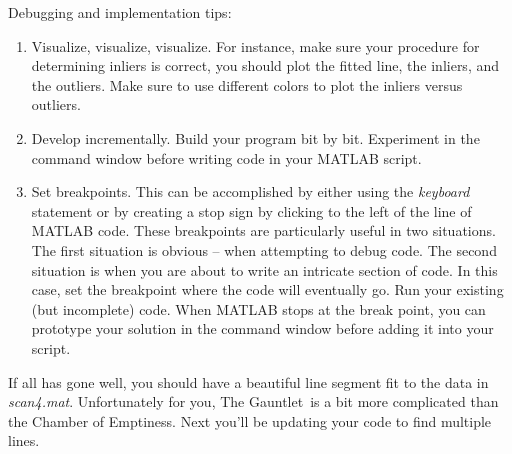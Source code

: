 \documentclass{tufte-handout}
\begin{document}
\vspace{1em}
\begin{myboxi}
Debugging and implementation tips:
\begin{enumerate}
\item Visualize, visualize, visualize.  For instance, make sure your procedure for determining inliers is correct, you should plot the fitted line, the inliers, and the outliers.  Make sure to use different colors to plot the inliers versus outliers.
\item Develop incrementally.  Build your program bit by bit.  Experiment in the command window before writing code in your MATLAB script.
\item Set breakpoints.  This can be accomplished by either using the \emph{keyboard} statement or by creating a stop sign by clicking to the left of the line of MATLAB code.  These breakpoints are particularly useful in two situations.  The first situation is obvious -- when attempting to debug code.  The second situation is when you are about to write an intricate section of code.  In this case, set the breakpoint where the code will eventually go.  Run your existing (but incomplete) code.  When MATLAB stops at the break point, you can prototype your solution in the command window before adding it into your script.
\end{enumerate}
\end{myboxi}

If all has gone well, you should have a beautiful line segment fit to the data in \emph{scan4.mat}.  Unfortunately for you, The Gauntlet\texttrademark~is a bit more complicated than the Chamber of Emptiness\texttrademark.  Next you'll be updating your code to find multiple lines.
\end{document}
